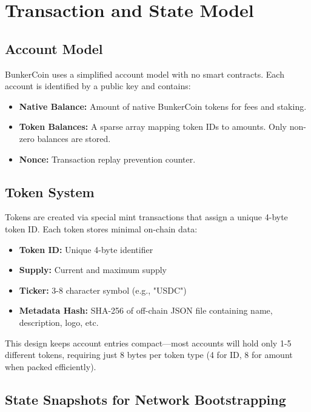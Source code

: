 \documentclass{article}
\begin{document}
\section{Transaction and State Model}
\label{sec:transaction_state}

\subsection{Account Model}
\label{sec:account_model}

BunkerCoin uses a simplified account model with no smart contracts. Each account is identified by a public key and contains:

\begin{itemize}
    \item \textbf{Native Balance:} Amount of native BunkerCoin tokens for fees and staking.
    \item \textbf{Token Balances:} A sparse array mapping token IDs to amounts. Only non-zero balances are stored.
    \item \textbf{Nonce:} Transaction replay prevention counter.
\end{itemize}

\subsection{Token System}
\label{sec:tokens}

Tokens are created via special mint transactions that assign a unique 4-byte token ID. Each token stores minimal on-chain data:

\begin{itemize}
    \item \textbf{Token ID:} Unique 4-byte identifier
    \item \textbf{Supply:} Current and maximum supply
    \item \textbf{Ticker:} 3-8 character symbol (e.g., "USDC")
    \item \textbf{Metadata Hash:} SHA-256 of off-chain JSON file containing name, description, logo, etc.
\end{itemize}

This design keeps account entries compact—most accounts will hold only 1-5 different tokens, requiring just 8 bytes per token type (4 for ID, 8 for amount when packed efficiently).

\subsection{State Snapshots for Network Bootstrapping}
\end{document}
